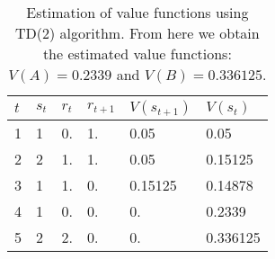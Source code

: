 \documentclass[12pt]{article}
\begin{document}
\begin{table}[H]
    \centering
    \caption{Estimation of value functions using TD(2) algorithm. From here we obtain the estimated value functions: $V(A) = 0.2339$ and $V(B) = 0.336125$.}
    \label{tab:TD2}
    \begin{tabular}{|l|l|l|l|l|l|}
    \hline
    $t$ & $s_{t}$ & $r_{t}$ & $r_{t+1}$ & $V(s_{t+1})$ & $V(s_t)$ \\ \hline
    1   & 1       & 0.      & 1.        & 0.05         & 0.05     \\ \hline
    2   & 2       & 1.      & 1.        & 0.05         & 0.15125  \\ \hline
    3   & 1       & 1.      & 0.        & 0.15125      & 0.14878  \\ \hline
    4   & 1       & 0.      & 0.        & 0.           & 0.2339   \\ \hline
    5   & 2       & 2.      & 0.        & 0.           & 0.336125 \\ \hline
    \end{tabular}
\end{table}
\end{document}
